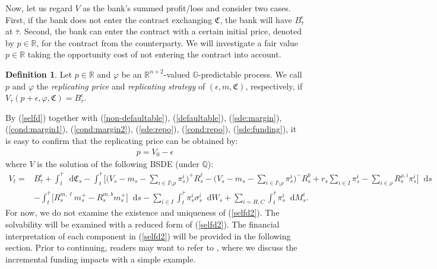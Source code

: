 \documentclass[a4paper, 11pt]{article}              %
\numberwithin{equation}{section}
\theoremstyle{plain}
\newcommand{\btau}{\bar{\tau}}
\newcommand{\1}{\mathds{1}}
\newcommand{\frC}{\mathfrak{C}}
\newcommand{\dsQ}{\mathbb{Q}}
\newcommand{\dsR}{\mathbb{R}}
\newcommand{\dsG}{\mathbb{G}}
\newcommand{\SUM}{\displaystyle\sum}
\newcommand{\IS}{^i_s}
\theoremstyle{plain}
\newtheorem{definition}[thm]{Definition}
\theoremstyle{definition}
\newtheorem{definition}{Definition}
\theoremstyle{plain}
\newcommand*\df{\mathop{}\!\mathrm{d}}
\begin{document}
Now, let us regard $V$ as the bank's summed profit/loss and consider two
cases. First, if the bank does not enter the contract exchanging $\frC$, the
bank will have $B^\epsilon_{\btau}$ at $\btau$. Second, the bank can enter the contract
with a certain initial price,  denoted by $p\in \dsR$, for the
contract from the counterparty. We will investigate a fair value $p \in \dsR$
taking the opportunity cost of not entering the contract into account.
\begin{definition}
  Let $p\in \dsR$ and $\varphi$ be an $\dsR^{n+2}$-valued $\dsG$-predictable
  process. We call $p$ and $\varphi$ the \textit{replicating price} and
  \textit{replicating strategy} of $(\epsilon, m, \frC)$, respectively, if
  $V_{\btau}(p+\epsilon, \varphi, \frC) = B^\epsilon_{\btau}$.
\end{definition}
By (\ref{selfd}) together with (\ref{non-defaultable}), (\ref{defaultable}),
(\ref{sde:margin}), (\ref{cond:margin1}), (\ref{cond:margin2}),
(\ref{sde:repo}), (\ref{cond:repo}), (\ref{sde:funding}), it is easy
to confirm that the replicating price can be obtained by:
\begin{align}
p=V_0 - \epsilon    \label{i.price}
\end{align}
where $V$ is the solution of the following BSDE (under $\dsQ$):
\begin{align}\label{selfd2} 
V_t = 
  &B^\epsilon_{\btau}+\int_t^{\btau}\df \frC_s
    -\int_{t}^{\btau}\bigg[\big(V_s - m_s - \SUM_{i \in I \setminus \rho} \pi^i_s\big)^{+}R^{\ell}_s
      -\big(V_s - m_s - \SUM_{i \in I \setminus \rho}\pi^i_s\big)^{-}R^{b}_s
      +r_s\SUM_{i \in I}\pi\IS-\SUM_{i \in \rho}R^{\rho, i}_s\pi\IS\bigg]\df s\nonumber\\
  &-\int_{t}^{\btau}\bigg[ R^{m, \ell}_sm^+_s - R^{m, b}_sm^+_s\bigg]\df s
    -\SUM_{i \in I}\int_{t}^{\btau}\pi\IS\sigma\IS\df W_s
    + \SUM_{i =H, C}\int_{t}^{\btau}\pi^i_s\df M^i_s.
\end{align} 
For now, we do not examine the existence and uniqueness of
(\ref{selfd2}). The solvability will be examined with a reduced form of
(\ref{selfd2}). The financial interpretation of each component in (\ref{selfd2})
will be provided  in the following section.
Prior to continuing, readers may want to refer to , where we
discuss the incremental funding impacts with a simple example.
\end{document}
